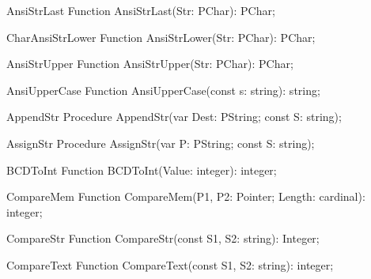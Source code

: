  
\begin{function}{AnsiStrLast}
\Declaration
Function AnsiStrLast(Str: PChar): PChar;
\Description
\Errors
\SeeAlso
\end{function}

 
\begin{function}{CharAnsiStrLower}
\Declaration
Function AnsiStrLower(Str: PChar): PChar;
\Description
\Errors
\SeeAlso
\end{function}

 
\begin{function}{AnsiStrUpper}
\Declaration
Function AnsiStrUpper(Str: PChar): PChar;
\Description
\Errors
\SeeAlso
\end{function}

 
\begin{function}{AnsiUpperCase}
\Declaration
Function AnsiUpperCase(const s: string): string;
\Description
\Errors
\SeeAlso
\end{function}

 
\begin{procedure}{AppendStr}
\Declaration
Procedure AppendStr(var Dest: PString; const S: string);
\Description
\Errors
\SeeAlso
\end{procedure}

 
\begin{procedure}{AssignStr}
\Declaration
Procedure AssignStr(var P: PString; const S: string);
\Description
\Errors
\SeeAlso
\end{procedure}

 
\begin{function}{BCDToInt}
\Declaration
Function BCDToInt(Value: integer): integer;
\Description
\Errors
\SeeAlso
\end{function}

 
\begin{function}{CompareMem}
\Declaration
Function CompareMem(P1, P2: Pointer; Length: cardinal): integer;
\Description
\Errors
\SeeAlso
\end{function}

 
\begin{function}{CompareStr}
\Declaration
Function CompareStr(const S1, S2: string): Integer;
\Description
\Errors
\SeeAlso
\end{function}

 
\begin{function}{CompareText}
\Declaration
Function CompareText(const S1, S2: string): integer;
\Description
\Errors
\SeeAlso
\end{function}

